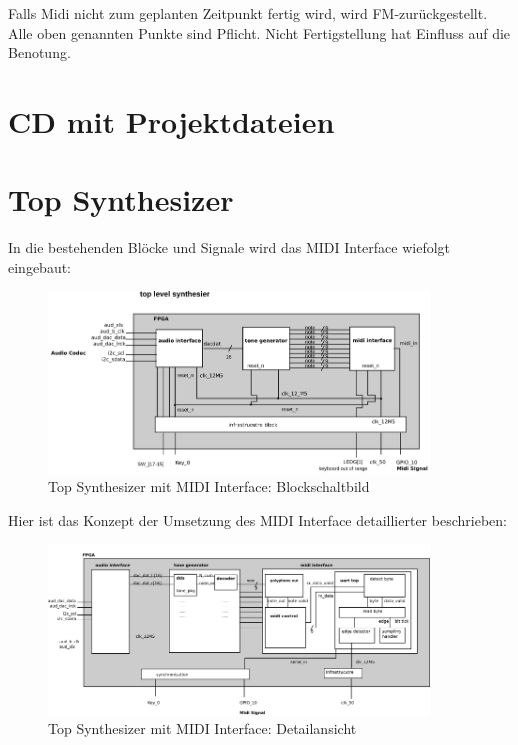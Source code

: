 Falls Midi nicht zum geplanten Zeitpunkt fertig wird, wird FM-zurückgestellt. Alle oben genannten Punkte sind Pflicht.
Nicht Fertigstellung hat Einfluss auf die Benotung.



\chapter{CD mit Projektdateien}\label{sect.anhang_cd}


\chapter{Top Synthesizer}\label{chap.anhang_top_synthesizer}

In die bestehenden Blöcke und Signale wird das MIDI Interface wiefolgt eingebaut:\\
\begin{figure}[H]
	\includegraphics[width=0.9\textwidth]{images/midi_interface/top_synthesizer_block_saled.png}
	\caption{Top Synthesizer mit MIDI Interface: Blockschaltbild}
	\label{fig.top_synthesizer_block}
\end{figure}

Hier ist das Konzept der Umsetzung des MIDI Interface detaillierter beschrieben:\\
\begin{figure}[H]
	\includegraphics[width=0.9\textwidth]{images/midi_interface/top_synthesizer_detail_scaled.png}
	\caption{Top Synthesizer mit MIDI Interface: Detailansicht}
	\label{fig.top_synthesizer_detail}
\end{figure}


